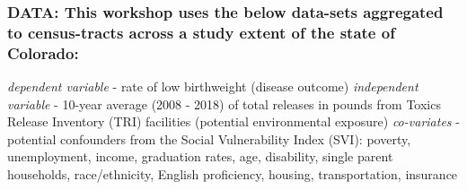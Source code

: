 \documentclass[
  12pt,
]{article}
\begin{document}
\hypertarget{data-this-workshop-uses-the-below-data-sets-aggregated-to-census-tracts-across-a-study-extent-of-the-state-of-colorado}{%
\subsubsection{DATA: This workshop uses the below data-sets aggregated
to census-tracts across a study extent of the state of
Colorado:}\label{data-this-workshop-uses-the-below-data-sets-aggregated-to-census-tracts-across-a-study-extent-of-the-state-of-colorado}}

\emph{dependent variable} - rate of low birthweight (disease outcome)
\emph{independent variable} - 10-year average (2008 - 2018) of total
releases in pounds from Toxics Release Inventory (TRI) facilities
(potential environmental exposure) \emph{co-variates} - potential
confounders from the Social Vulnerability Index (SVI): poverty,
unemployment, income, graduation rates, age, disability, single parent
households, race/ethnicity, English proficiency, housing,
transportation, insurance
\end{document}
